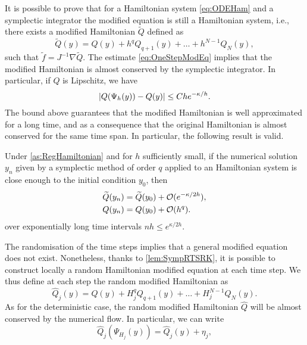 \documentclass[10pt]{article}
\begin{document}
It is possible to prove that for a Hamiltonian system \eqref{eq:ODEHam} and a symplectic integrator the modified equation is still a Hamiltonian system, i.e., there exists a modified Hamiltonian $\tilde Q$ defined as
\begin{equation}\label{eq:ModifiedHamiltonianTrunc}
\tilde Q(y) = Q(y) + h^q Q_{q+1}(y) + \ldots + h^{N-1} Q_N(y),
\end{equation}
such that $\tilde f = J^{-1} \nabla \tilde Q$. The estimate \eqref{eq:OneStepModEq} implies that the modified Hamiltonian is almost conserved by the symplectic integrator. In particular, if $Q$ is Lipschitz, we have
\begin{equation}
\lvert Q(\Psi_h(y)) - Q(y)\rvert \leq Che^{-\kappa/h}.
\end{equation}
The bound above guarantees that the modified Hamiltonian is well approximated for a long time, and as a consequence that the original Hamiltonian is almost conserved for the same time span. In particular, the following result is valid.
\begin{theorem} Under \cref{as:RegHamiltonian} and for $h$ sufficiently small, if the numerical solution $y_n$ given by a symplectic method of order $q$ applied to an Hamiltonian system is close enough to the initial condition $y_0$, then 
	\begin{equation}
	\begin{aligned}
	\widetilde Q(y_n) &= \widetilde Q(y_0) + \mathcal{O}(e^{-\kappa / 2h}), \\
	Q(y_n) &= Q(y_0) + \mathcal{O}(h^q).
	\end{aligned}
	\end{equation}
	over exponentially long time intervals $nh \leq e^{\kappa / 2h}$.
\end{theorem}
The randomisation of the time steps implies that a general modified equation does not exist. Nonetheless, thanks to \cref{lem:SympRTSRK}, it is possible to construct locally a random Hamiltonian modified equation at each time step. We thus define at each step the random modified Hamiltonian as
\begin{equation}
\hat Q_j(y) = Q(y) + H_j^q Q_{q+1}(y) + \ldots + H_j^{N-1} Q_N(y).
\end{equation}
As for the deterministic case, the random modified Hamiltonian $\hat Q$ will be almost conserved by the numerical flow. In particular, we can write
\begin{equation}\label{eq:etaJ}
\hat Q_j(\Psi_{H_j}(y)) = \hat Q_j(y) + \eta_j,
\end{equation} 
\end{document}
